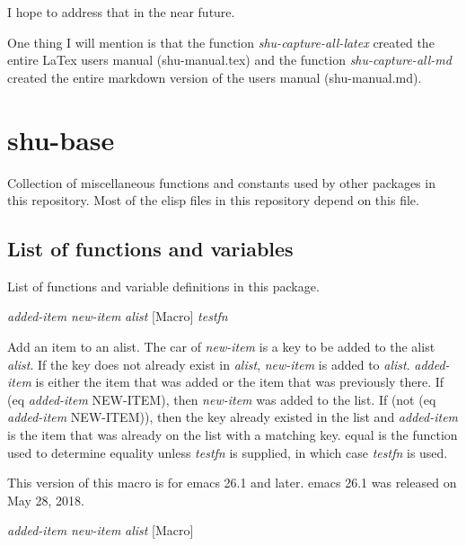 I hope to address that in the near future.

One thing I will mention is that the function \emph{shu-capture-all-latex} created
the entire LaTex users manual (shu-manual.tex) and the function
\emph{shu-capture-all-md} created the entire markdown version of the users manual
(shu-manual.md).


\eject
\section{shu-base}


Collection of miscellaneous functions  and constants used by other
packages in this repository.  Most of the elisp files in this repository
depend on this file.


\subsection{List of functions and variables}

List of functions and variable definitions in this package.



\vspace{1em}
\noindent
{}
\usebox{\funcname}\emph{added-item} \emph{new-item} \emph{alist}
 \hfill [Macro]
\hspace*{\wd\funcname}\emph{testfn}

\begin{doc-string}
Add an item to an alist.  The car of \emph{new-item} is a key to be added to the
alist \emph{alist}.  If the key does not already exist in \emph{alist}, \emph{new-item} is added to
\emph{alist}.  \emph{added-item} is either the item that was added or the item that was
previously there.  If (eq \emph{added-item} NEW-ITEM), then \emph{new-item} was added to the
list.  If (not (eq \emph{added-item} NEW-ITEM)), then the key already existed in the
list and \emph{added-item} is the item that was already on the list with a matching
key.  equal is the function used to determine equality unless \emph{testfn} is
supplied, in which case \emph{testfn} is used.

This version of this macro is for emacs 26.1 and later.  emacs 26.1 was released
on May 28, 2018.
\end{doc-string}

\vspace{1em}
\noindent
{}
\usebox{\funcname}\emph{added-item} \emph{new-item} \emph{alist}
 \hfill [Macro]

